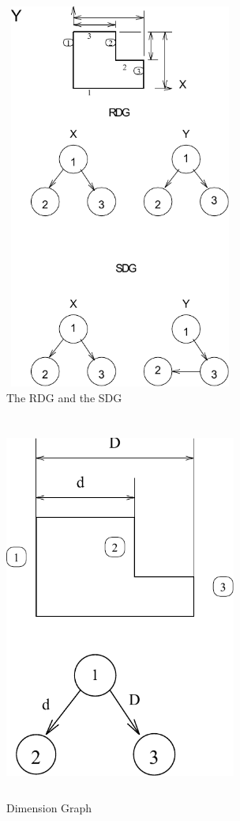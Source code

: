         \begin{figure}[htbp]
                                    \hspace{2cm}
            \includegraphics[width=3.0in,height=5.0in]{RDGSDG.pdf}

            \caption{The RDG and the SDG}
            \label{rdgsdg}
        \end{figure}
     \begin{figure}[htbp]
                                    \hspace{2cm}
            \includegraphics[width=3.0in,height=5.0in]{DIMGRA.pdf}
            \caption{Dimension Graph}
            \label{dimgra}
        \end{figure}


